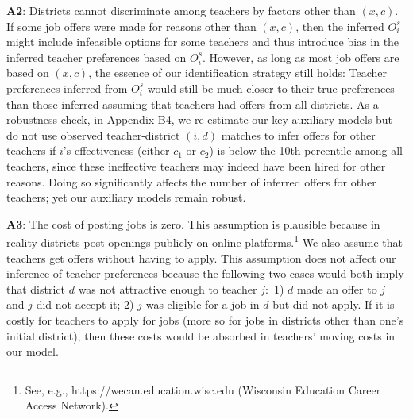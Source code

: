 \documentclass[notitlepage,12pt]{article}%
\begin{document}
\noindent \textbf{A2}: Districts cannot discriminate among
teachers by factors other than $\left(  x,c\right)  $. If some job offers were
made for reasons other than $\left(  x,c\right)  $, then the inferred
$O_{i}^{s}$ might include infeasible options for some teachers and thus
introduce bias in the inferred teacher preferences based on $O_{i}^{s}.$
However, as long as most job offers are based on $\left(  x,c\right)  $, the
essence of our identification strategy still holds: Teacher preferences
inferred from $O_{i}^{s}$ would still be much closer to their true preferences
than those inferred assuming that teachers had offers from all districts. As a
robustness check, in Appendix B4, we re-estimate our key auxiliary
models but do not use observed teacher-district $\left(  i,d\right)  $ matches
to infer offers for other teachers if $i$'s effectiveness (either $c_{1}$ or
$c_{2}$) is below the 10th percentile among all teachers, since these
ineffective teachers may indeed have been hired for other reasons. Doing so
significantly affects the number of inferred offers for other teachers; yet
our auxiliary models remain robust. 

\noindent \textbf{A3}: The cost of posting jobs is zero. This assumption is plausible because in reality districts post openings
publicly on online platforms.\footnote{See, e.g.,
https://wecan.education.wisc.edu (Wisconsin Education Career Access Network).}
We also assume that teachers get offers without having to apply. This
assumption does not affect our inference of teacher preferences because the
following two cases would both imply that district $d$ was not attractive
enough to teacher $j:$ 1) $d$ made an offer to $j$ and $j$ did not accept it;
2) $j$ was eligible for a job in $d$ but did not apply. If it is costly for
teachers to apply for jobs (more so for jobs in districts other than one's
initial district), then these costs would be absorbed in teachers' moving
costs in our model.\\
\end{document}

